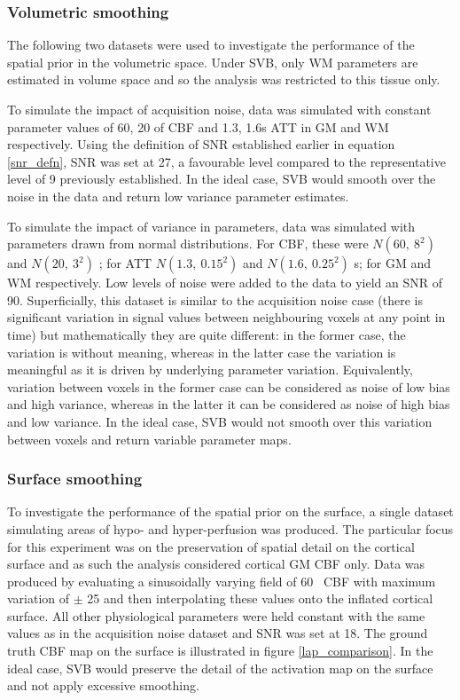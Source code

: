 \subsubsection{Volumetric smoothing}

The following two datasets were used to investigate the performance of the spatial prior in the volumetric space. Under SVB, only WM parameters are estimated in volume space and so the analysis was restricted to this tissue only.  

To simulate the impact of acquisition noise, data was simulated with constant parameter values of 60, 20 \cbf of CBF and 1.3, 1.6s ATT in GM and WM respectively. Using the definition of SNR established earlier in equation \ref{snr_defn}, SNR was set at 27, a favourable level compared to the representative level of 9 previously established. In the ideal case, SVB would smooth over the noise in the data and return low variance parameter estimates.

To simulate the impact of variance in parameters, data was simulated with parameters drawn from normal distributions. For CBF, these were $N(60,\ 8^2)$ and $N(20,\ 3^2)$ \cbf; for ATT $N(1.3,\ 0.15^2)$ and $N(1.6,\ 0.25^2)$ s; for GM and WM respectively. Low levels of noise were added to the data to yield an SNR of 90. Superficially, this dataset is similar to the acquisition noise case (there is significant variation in signal values between neighbouring voxels at any point in time) but mathematically they are quite different: in the former case, the variation is without meaning, whereas in the latter case the variation is meaningful as it is driven by underlying parameter variation. Equivalently, variation between voxels in the former case can be considered as noise of low bias and high variance, whereas in the latter it can be considered as noise of high bias and low variance. In the ideal case, SVB would not smooth over this variation between voxels and return variable parameter maps.

\subsubsection{Surface smoothing}

To investigate the performance of the spatial prior on the surface, a single dataset simulating areas of hypo- and hyper-perfusion was produced. The particular focus for this experiment was on the preservation of spatial detail on the cortical surface and as such the analysis considered cortical GM CBF only. Data was produced by evaluating a sinusoidally varying field of 60 \cbf\ CBF with maximum variation of $\pm$ 25 and then interpolating these values onto the inflated cortical surface. All other physiological parameters were held constant with the same values as in the acquisition noise dataset and SNR was set at 18. The ground truth CBF map on the surface is illustrated in figure \ref{lap_comparison}. In the ideal case, SVB would preserve the detail of the activation map on the surface and not apply excessive smoothing. 

